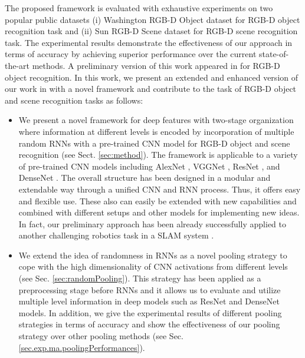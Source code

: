 \documentclass[10pt,journal,compsoc]{IEEEtran}
\begin{document}
The proposed framework is evaluated with exhaustive experiments on two popular public datasets (i) Washington RGB-D Object dataset \cite{Lai_ICRA_2011} for RGB-D object recognition task and (ii) Sun RGB-D Scene dataset \cite{Song_CVPR_2015} for RGB-D scene recognition task. The experimental results demonstrate the effectiveness of our approach in terms of accuracy by achieving superior performance over the current state-of-the-art methods. A preliminary version of this work appeared in \cite{Caglayan_ECCVW_2018} for RGB-D object recognition. In this work, we present an extended and enhanced version of our work in \cite{Caglayan_ECCVW_2018} with a novel framework and contribute to the task of RGB-D object and scene recognition tasks as follows:
\begin{itemize}
	\item We present a novel framework for deep features with two-stage organization where information at different levels is encoded by incorporation of multiple random RNNs with a pre-trained CNN model for RGB-D object and scene recognition (see Sect. \ref{sec:method}). The framework is applicable to a variety of pre-trained CNN models including AlexNet \cite{Krizhevsky_NIPS_2012}, VGGNet \cite{Simonyan_ICLR_2015}, ResNet \cite{He_CVPR_2016}, and DenseNet \cite{Huang_CVPR_2017}. The overall structure has been designed in a modular and extendable way through a unified CNN and RNN process. Thus, it offers easy and flexible use. These also can easily be extended with new capabilities and combined with different setups and other models for implementing new ideas. In fact, our preliminary approach has been already successfully applied to another challenging robotics task in a SLAM system \cite{Guclu_CVPRW_2019}.
	
	\item We extend the idea of randomness in RNNs as a novel pooling strategy to cope with the high dimensionality of CNN activations from different levels (see Sec. \ref{sec:randomPooling}). This strategy has been applied as a preprocessing stage before RNNs and it allows us to evaluate and utilize multiple level information in deep models such as ResNet \cite{He_CVPR_2016} and DenseNet \cite{Huang_CVPR_2017} models. In addition, we give the experimental results of different pooling strategies in terms of accuracy and show the effectiveness of our pooling strategy over other pooling methods (see Sec. \ref{sec.exp.ma.poolingPerformances}). 
	

\end{itemize}
\end{document}
